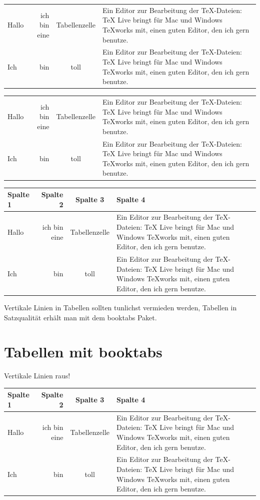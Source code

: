\documentclass[ngerman,12pt]{scrartcl}
\begin{document}
\begin{tabular}{|l|r|c|p{6cm}|}
Hallo & ich bin eine & Tabellenzelle & Ein Editor zur Be\-ar\-beitung der TeX-Dateien: TeX Live bringt für Mac und Windows TeXworks mit, einen guten Editor, den ich gern benutze.  \\
Ich & bin & toll & Ein Editor zur Bearbeitung der TeX-Dateien: TeX Live bringt für Mac und Windows TeXworks mit, einen guten Editor, den ich gern benutze.  \\
\end{tabular}

\begin{tabular}{|l|r|c|p{6cm}|}
Hallo & ich bin eine & Tabellenzelle & Ein Editor zur Be\-ar\-beitung der TeX-Dateien: TeX Live bringt für Mac und Windows TeXworks mit, einen guten Editor, den ich gern benutze.  \\
Ich & bin & toll & Ein Editor zur Bearbeitung der TeX-Dateien: TeX Live bringt für Mac und Windows TeXworks mit, einen guten Editor, den ich gern benutze.  \\
\end{tabular}

\vspace*{2cm}

\begin{tabular}{|l|r|c|p{6cm}|} \hline
Spalte 1 & Spalte 2 & Spalte 3 & Spalte 4 \\ \hline
Hallo & ich bin eine & Tabellenzelle & Ein Editor zur Be\-ar\-beitung der TeX-Dateien: TeX Live bringt für Mac und Windows TeXworks mit, einen guten Editor, den ich gern benutze.  \\ \hline
Ich & bin & toll & Ein Editor zur Bearbeitung der TeX-Dateien: TeX Live bringt für Mac und Windows TeXworks mit, einen guten Editor, den ich gern benutze.  \\ \hline
\end{tabular}

Vertikale Linien in Tabellen sollten tunlichst vermieden werden, Tabellen in Satzqualität erhält man mit dem booktabs Paket.

\section*{Tabellen mit booktabs}

Vertikale Linien raus!

\begin{tabular}{lrcp{6cm}} \hline
Spalte 1 & Spalte 2 & Spalte 3 & Spalte 4 \\ \hline
Hallo & ich bin eine & Tabellenzelle & Ein Editor zur Be\-ar\-beitung der TeX-Dateien: TeX Live bringt für Mac und Windows TeXworks mit, einen guten Editor, den ich gern benutze.  \\ \hline
Ich & bin & toll & Ein Editor zur Bearbeitung der TeX-Dateien: TeX Live bringt für Mac und Windows TeXworks mit, einen guten Editor, den ich gern benutze.  \\ \hline
\end{tabular}
\end{document}

